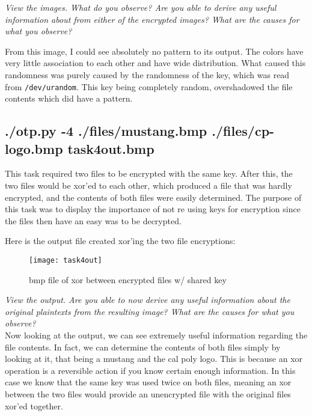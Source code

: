 \documentclass[12pt]{exam}
\begin{document}
    \textit{View the images. What do you observe? Are you able to derive any
    useful information about from either of the encrypted images? What are the
    causes for what you observe?}

    From this image, I could see absolutely no pattern to its output. The colors
    have very little association to each other and have wide distribution. What
    caused this randomness was purely caused by the randomness of the key,
    which was read from \texttt{/dev/urandom}. This key being completely
    random, overshadowed the file contents which did have a pattern.

    \subsection{./otp.py -4 ./files/mustang.bmp ./files/cp-logo.bmp task4out.bmp}

\bigskip

This task required two files to be encrypted with the same key. After this, the
two files would be xor'ed to each other, which produced a file that was hardly
encrypted, and the contents of both files were easily determined. The purpose
of this task was to display the importance of not re using keys for encryption
since the files then have an easy was to be decrypted.

    \bigskip
    \bigskip
    
    \bigskip

    Here is the output file created xor'ing the two file encryptions:

    \begin{figure}[H]
        \centering
        \texttt{[image: task4out]}
        \caption{bmp file of xor between encrypted files w/
        shared key}
        \label{fig:task4}
    \end{figure}

    \textit{View the output. Are you able to now derive any useful information about
    the original plaintexts from the resulting image? What are the causes for
what you observe?}\\

    Now looking at the output, we can see extremely useful information regarding
    the file contents. In fact, we can determine the contents of both files
    simply by looking at it, that being a mustang and the cal poly logo. This is
    because an xor operation is a reversible action if you know certain enough
    information. In this case we know that the same key was used twice on both
    files, meaning an xor between the two files would provide an unencrypted
    file with the original files xor'ed together.
\end{document}
